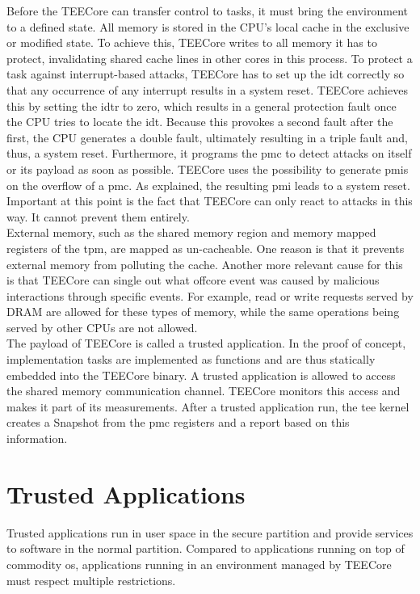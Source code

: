 Before the TEECore can transfer control to tasks, it must bring the environment
to a defined state. All memory is stored in the CPU's local cache in the
exclusive or modified state. To achieve this, TEECore writes to all memory it
has to protect, invalidating shared cache lines in other cores in this process.
To protect a task against interrupt-based attacks, TEECore has to set up the
\gls{idt} correctly so that any occurrence of any interrupt results in a system
reset. TEECore achieves this by setting the \gls{idtr} to zero, which results in
a general protection fault once the CPU tries to locate the \gls{idt}. Because
this provokes a second fault after the first, the CPU generates a double fault,
ultimately resulting in a triple fault and, thus, a system reset. Furthermore,
it programs the \gls{pmc} to detect attacks on itself or its payload as soon as
possible. TEECore uses the possibility to generate \glspl{pmi} on the overflow
of a \gls{pmc}. As explained, the resulting \gls{pmi} leads to a system reset.
Important at this point is the fact that TEECore can only react to attacks in
this way. It cannot prevent them entirely.\\

External memory, such as the shared memory region and memory mapped registers of
the \gls{tpm}, are mapped as un-cacheable. One reason is that it prevents
external memory from polluting the cache. Another more relevant cause for this
is that TEECore can single out what offcore event was caused by malicious
interactions through specific events. For example, read or write requests served
by DRAM are allowed for these types of memory, while the same operations being
served by other CPUs are not allowed.\\

The payload of TEECore is called a trusted application. In the proof of concept,
implementation tasks are implemented as functions and are thus statically
embedded into the TEECore binary. A trusted application is allowed to access the
shared memory communication channel. TEECore monitors this access and makes it
part of its measurements. After a trusted application run, the \gls{tee} kernel
creates a Snapshot from the \gls{pmc} registers and a report based on this
information.

\section{Trusted Applications}
\label{sec:30:tee_apps}
Trusted applications run in user space in the secure partition and provide
services to software in the normal partition. Compared to applications running
on top of commodity \gls{os}, applications running in an environment managed by
TEECore must respect multiple restrictions.\\

